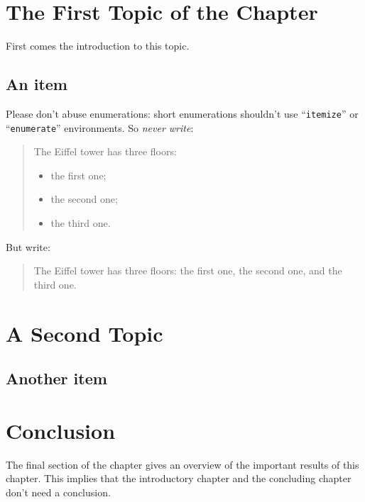 \section{The First Topic of the Chapter}
First comes the introduction to this topic.

\lipsum[55]

\subsection{An item}
Please don't abuse enumerations: short enumerations shouldn't use
``\verb|itemize|'' or ``\texttt{enumerate}'' environments.
So \emph{never write}: 
\begin{quote}
  The Eiffel tower has three floors:
  \begin{itemize}
  \item the first one;
  \item the second one;
  \item the third one.
  \end{itemize}
\end{quote}
But write:
\begin{quote}
  The Eiffel tower has three floors: the first one, the second one, and the
  third one.
\end{quote}

\section{A Second Topic}
\lipsum[64]

\subsection{Another item}
\lipsum[56-57]

\section{Conclusion}
The final section of the chapter gives an overview of the important results
of this chapter. This implies that the introductory chapter and the
concluding chapter don't need a conclusion.

\lipsum[66]

